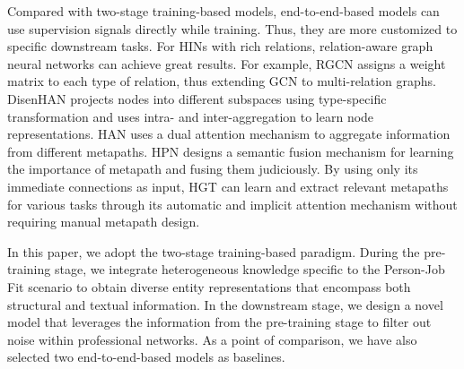 Compared with two-stage training-based models, end-to-end-based models can use supervision signals directly while training. Thus, they are more customized to specific downstream tasks. For HINs with rich relations, relation-aware graph neural networks can achieve great results. For example, RGCN \cite{schlichtkrull2018modeling} assigns a weight matrix to each type of relation, thus extending GCN \cite{welling2016semi} to multi-relation graphs. DisenHAN \cite{wang2020disenhan} projects nodes into different subspaces using type-specific transformation and uses intra- and inter-aggregation to learn node representations. HAN \cite{wang2019heterogeneous} uses a dual attention mechanism to aggregate information from different metapaths. HPN \cite{ji2021heterogeneous} designs a semantic fusion mechanism for learning the importance of metapath and fusing them judiciously. By using only its immediate connections as input, HGT \cite{hu2020heterogeneous} can learn and extract relevant metapaths for various tasks through its automatic and implicit attention mechanism without requiring manual metapath design.

In this paper, we adopt the two-stage training-based paradigm. During the pre-training stage, we integrate heterogeneous knowledge specific to the Person-Job Fit scenario to obtain diverse entity representations that encompass both structural and textual information. In the downstream stage, we design a novel model that leverages the information from the pre-training stage to filter out noise within professional networks. As a point of comparison, we have also selected two end-to-end-based models as baselines.